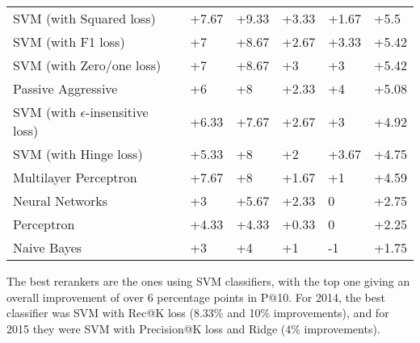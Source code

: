\begin{table}[h!]
{\begin{tabular}{@{}llllll@{}}
SVM (with Squared loss)                               & +7.67                    & +9.33                       & +3.33                    & +1.67                       & +5.5              \\ 
SVM (with F1 loss)                                       & +7                       & +8.67                       & +2.67                    & +3.33                       & +5.42             \\ 
SVM (with Zero/one loss)                                        & +7                       & +8.67                       & +3                       & +3                          & +5.42             \\ 
Passive Aggressive                             & +6                       & +8                          & +2.33                    & +4                          & +5.08             \\ 
SVM (with $\epsilon$-insensitive loss)                            & +6.33                    & +7.67                       & +2.67                    & +3                          & +4.92             \\ 
SVM (with Hinge loss)                                     & +5.33                    & +8                          & +2                       & +3.67                       & +4.75             \\ 
Multilayer Perceptron                           & +7.67                    & +8                          & +1.67                    & +1                          & +4.59             \\ 
Neural Networks                               & +3                       & +5.67                       & +2.33                    & 0                          & +2.75             \\ 
Perceptron                                      & +4.33                    & +4.33                       & +0.33                    & 0                          & +2.25             \\ 
Naive Bayes                                      & +3                       & +4                          & +1                       & -1                         & +1.75             \\ \bottomrule
\end{tabular}%
}
\end{table}

The best rerankers are the ones using SVM classifiers, with the top one giving an overall improvement of over 6 percentage
points in P@10. For 2014, the best classifier was SVM with Rec@K loss (8.33\% and 10\% improvements), 
and for 2015 they were SVM with Precision@K loss and Ridge (4\% improvements).

